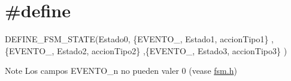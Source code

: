 \hypertarget{#define-example}{}\section{\#define}
D\+E\+F\+I\+N\+E\+\_\+\+F\+S\+M\+\_\+\+S\+T\+A\+TE(Estado0, \{E\+V\+E\+N\+T\+O\+\_, Estado1, accion\+Tipo1\} ,\{E\+V\+E\+N\+T\+O\+\_, Estado2, accion\+Tipo2\} ,\{E\+V\+E\+N\+T\+O\+\_, Estado3, accion\+Tipo3\} ) \begin{DoxyNote}{Note}
Los campos E\+V\+E\+N\+T\+O\+\_\+n no pueden valer 0 (vease \hyperlink{fsm_8h}{fsm.\+h})
\end{DoxyNote}

\begin{DoxyCodeInclude}
\end{DoxyCodeInclude}
 
